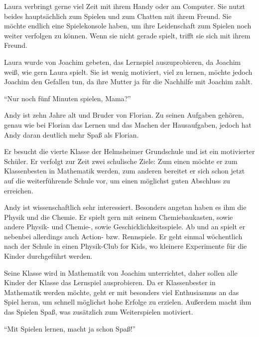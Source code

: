 \begin{description}
\begin{description}
			\item[Interessen und Hobbys]{Laura verbringt gerne viel Zeit mit ihrem Handy oder am Computer. Sie nutzt beides hauptsächlich zum Spielen und zum Chatten mit ihrem Freund. Sie möchte endlich eine Spielekonsole haben, um ihre Leidenschaft zum Spielen noch weiter verfolgen zu können. Wenn sie nicht gerade spielt, trifft sie sich mit ihrem Freund.}
			\item[Motivation]{Laura wurde von Joachim gebeten, das Lernspiel auszuprobieren, da Joachim weiß, wie gern Laura spielt. Sie ist wenig motiviert, viel zu lernen, möchte jedoch Joachim den Gefallen tun, da ihre Mutter ja für die Nachhilfe mit Joachim zahlt.}
			\item{\enquote{Nur noch fünf Minuten spielen, Mama?}}
		\end{description}
		\item[Andy Klein: Der Experte]<TODO: Bild>\hfill
		\begin{description}
			\item[Familiäres Umfeld]{Andy ist zehn Jahre alt und Bruder von Florian. Zu seinen Aufgaben gehören, genau wie bei Florian das Lernen und das Machen der Hausaufgaben, jedoch hat Andy daran deutlich mehr Spaß als Florian.}
			\item[Schulisches Umfeld]{Er besucht die vierte Klasse der Helmsheimer Grundschule und ist ein motivierter Schüler. Er verfolgt zur Zeit zwei schulische Ziele: Zum einen möchte er zum Klassenbesten in Mathematik werden, zum anderen bereitet er sich schon jetzt auf die weiterführende Schule vor, um einen möglichst guten Abschluss zu erreichen. }
			\item[Interessen und Hobbys]{Andy ist wissenschaftlich sehr interessiert. Besonders angetan haben es ihm die Physik und die Chemie. Er spielt gern mit seinem Chemiebaukasten, sowie andere Physik- und Chemie-, sowie Geschicklichkeitsspiele. Ab und an spielt er nebenbei allerdings auch Action- bzw. Rennspiele. Er geht einmal wöchentlich nach der Schule in einen Physik-Club for Kids, wo kleinere Experimente für die Kinder durchgeführt werden.}
			\item[Motivation]{Seine Klasse wird in Mathematik von Joachim unterrichtet, daher sollen alle Kinder der Klasse das Lernspiel ausprobieren. Da er Klassenbester in Mathematik werden möchte, geht er mit besonders viel Enthusiasmus an das Spiel heran, um schnell möglichst hohe Erfolge zu erzielen. Außerdem macht ihm das Spielen Spaß, was zusätzlich zum Weiterspielen motiviert.}
			\item{\enquote{Mit Spielen lernen, macht ja schon Spaß!}}
		\end{description}
	\end{description}


